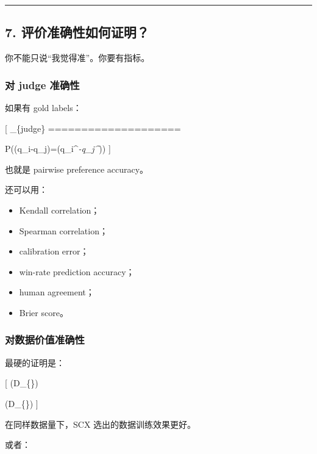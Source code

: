 \documentclass[
  12pt,
]{ctexart}
\providecommand{\tightlist}{%
  \setlength{\itemsep}{0pt}\setlength{\parskip}{0pt}}
\begin{document}
\begin{center}\rule{0.5\linewidth}{0.5pt}\end{center}

\subsection{7.
评价准确性如何证明？}\label{ux8bc4ux4ef7ux51c6ux786eux6027ux5982ux4f55ux8bc1ux660e}

你不能只说``我觉得准''。你要有指标。

\subsubsection{对 judge 准确性}\label{ux5bf9-judge-ux51c6ux786eux6027}

如果有 gold labels：

{[} \_\{judge\} ====================

P((q\_i-q\_j)=(q\_i\^{}\emph{-q\_j\^{}})) {]}

也就是 pairwise preference accuracy。

还可以用：

\begin{itemize}
\tightlist
\item
  Kendall correlation；
\item
  Spearman correlation；
\item
  calibration error；
\item
  win-rate prediction accuracy；
\item
  human agreement；
\item
  Brier score。
\end{itemize}

\subsubsection{对数据价值准确性}\label{ux5bf9ux6570ux636eux4ef7ux503cux51c6ux786eux6027}

最硬的证明是：

{[} (\mathcal D\_\{\})

\begin{quote}
\end{quote}

(\mathcal D\_\{\}) {]}

在同样数据量下，SCX 选出的数据训练效果更好。

或者：
\end{document}
